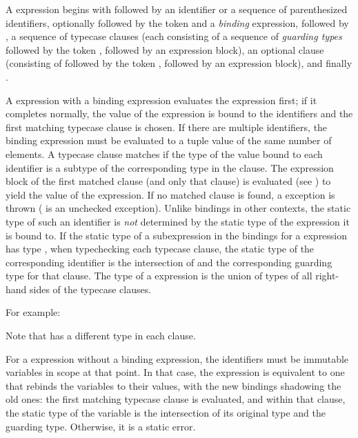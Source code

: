 A  expression begins with  followed by
an identifier or a sequence of parenthesized identifiers,
optionally followed by the token \EXP{=} and a \emph{binding} expression,
followed by , a sequence of typecase clauses
(each consisting of a sequence of \emph{guarding types}
followed by the token \EXP{\Rightarrow}, followed by an expression block),
an optional  clause
(consisting of  followed by the token \EXP{\Rightarrow},
followed by an expression block),
and finally .

A  expression with a binding expression
evaluates the expression first;
if it completes normally, the value of the expression is bound
to the identifiers and the first matching typecase clause is chosen.
If there are multiple identifiers, the binding expression must be evaluated
to a tuple value of the same number of elements.
A typecase clause matches if the type of the value bound to each identifier
is a subtype of the corresponding type in the clause.
The expression block of the first matched clause
(and only that clause) is evaluated (see ) to yield
the value of the  expression.
If no matched clause is found, a  exception is thrown
( is an unchecked exception).
Unlike bindings in other contexts,
the static type of such an identifier
is \emph{not} determined by the static type of
the expression it is bound to.
If the static type of a subexpression
in the bindings for a  expression has type ,
when typechecking each typecase clause,
the static type of the corresponding identifier is the intersection of 
and the corresponding guarding type for that clause.
The type of a  expression is the union
of types of all right-hand sides of the typecase clauses.



For example:

Note that  has a different type in each clause.

For a  expression without a binding expression,
the identifiers must be immutable variables in scope at that point.
In that case, the  expression is equivalent to one
that rebinds the variables to their values,
with the new bindings shadowing the old ones:
the first matching typecase clause is evaluated,
and within that clause, the static type of the variable
is the intersection of its original type and the guarding type.
Otherwise, it is a static error.

